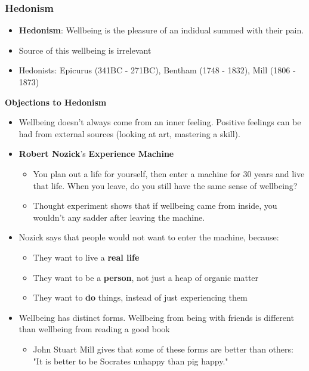 \documentclass{article}
\begin{document}
        \subsubsection{Hedonism}
        \begin{itemize}
            \item \textbf{Hedonism}: Wellbeing is the pleasure of an indidual summed with their pain.
            \item Source of this wellbeing is irrelevant
            \item Hedonists: Epicurus (341BC - 271BC), Bentham (1748 - 1832), Mill (1806 - 1873)
        \end{itemize}{}
        \textbf{Objections to Hedonism}
        \begin{itemize}
            \item Wellbeing doesn't always come from an inner feeling. Positive feelings can be had from external sources (looking at art, mastering a skill).
            \item \textbf{Robert Nozick}'s \textbf{Experience Machine}
            \begin{itemize}
                \item You plan out a life for yourself, then enter a machine for 30 years and live that life. When you leave, do you still have the same sense of wellbeing?
                \item Thought experiment shows that if wellbeing came from inside, you wouldn't any sadder after leaving the machine.
            \end{itemize}{}
            \item Nozick says that people would not want to enter the machine, because:
            \begin{itemize}
                \item They want to live a \textbf{real life}
                \item They want to be a \textbf{person}, not just a heap of organic matter
                \item They want to \textbf{do} things, instead of just experiencing them
            \end{itemize}{}
            \item Wellbeing has distinct forms. Wellbeing from being with friends is different than wellbeing from reading a good book
            \begin{itemize}
                \item John Stuart Mill gives that some of these forms are better than others: "It is better to be Socrates unhappy than pig happy."

\end{itemize}
\end{itemize}
\end{document}
